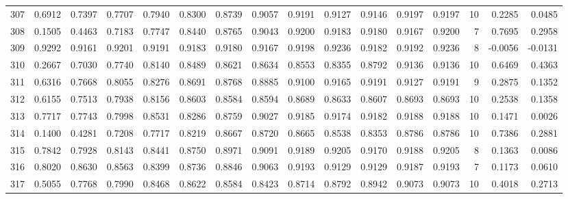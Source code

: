 \begin{tabular}{lrrrrrrrrrrrrrrr}
307 &      0.6912 &  0.7397 &  0.7707 &  0.7940 &  0.8300 &  0.8739 &  0.9057 &  0.9191 &  0.9127 &  0.9146 &   0.9197 &     0.9197 &     10 &                    0.2285 &                     0.0485 \\
308 &      0.1505 &  0.4463 &  0.7183 &  0.7747 &  0.8440 &  0.8765 &  0.9043 &  0.9200 &  0.9183 &  0.9180 &   0.9167 &     0.9200 &      7 &                    0.7695 &                     0.2958 \\
309 &      0.9292 &  0.9161 &  0.9201 &  0.9191 &  0.9183 &  0.9180 &  0.9167 &  0.9198 &  0.9236 &  0.9182 &   0.9192 &     0.9236 &      8 &                   -0.0056 &                    -0.0131 \\
310 &      0.2667 &  0.7030 &  0.7740 &  0.8140 &  0.8489 &  0.8621 &  0.8634 &  0.8553 &  0.8355 &  0.8792 &   0.9136 &     0.9136 &     10 &                    0.6469 &                     0.4363 \\
311 &      0.6316 &  0.7668 &  0.8055 &  0.8276 &  0.8691 &  0.8768 &  0.8885 &  0.9100 &  0.9165 &  0.9191 &   0.9127 &     0.9191 &      9 &                    0.2875 &                     0.1352 \\
312 &      0.6155 &  0.7513 &  0.7938 &  0.8156 &  0.8603 &  0.8584 &  0.8594 &  0.8689 &  0.8633 &  0.8607 &   0.8693 &     0.8693 &     10 &                    0.2538 &                     0.1358 \\
313 &      0.7717 &  0.7743 &  0.7998 &  0.8531 &  0.8286 &  0.8759 &  0.9027 &  0.9185 &  0.9174 &  0.9182 &   0.9188 &     0.9188 &     10 &                    0.1471 &                     0.0026 \\
314 &      0.1400 &  0.4281 &  0.7208 &  0.7717 &  0.8219 &  0.8667 &  0.8720 &  0.8665 &  0.8538 &  0.8353 &   0.8786 &     0.8786 &     10 &                    0.7386 &                     0.2881 \\
315 &      0.7842 &  0.7928 &  0.8143 &  0.8441 &  0.8750 &  0.8971 &  0.9091 &  0.9189 &  0.9205 &  0.9170 &   0.9188 &     0.9205 &      8 &                    0.1363 &                     0.0086 \\
316 &      0.8020 &  0.8630 &  0.8563 &  0.8399 &  0.8736 &  0.8846 &  0.9063 &  0.9193 &  0.9129 &  0.9129 &   0.9187 &     0.9193 &      7 &                    0.1173 &                     0.0610 \\
317 &      0.5055 &  0.7768 &  0.7990 &  0.8468 &  0.8622 &  0.8584 &  0.8423 &  0.8714 &  0.8792 &  0.8942 &   0.9073 &     0.9073 &     10 &                    0.4018 &                     0.2713 \\

\end{tabular}
